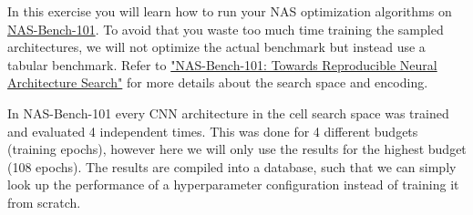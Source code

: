 \documentclass{exam}
\begin{document}
        \gccs
	In this exercise you will learn how to run your NAS optimization algorithms on \href{https://github.com/google-research/nasbench}{NAS-Bench-101}. To avoid that you waste too much time training the sampled architectures, we will not optimize the actual benchmark but instead use a tabular benchmark. Refer to \href{https://arxiv.org/abs/1902.09635}{"NAS-Bench-101: Towards Reproducible Neural Architecture Search"} for more details about the search space and encoding. 
	
	In NAS-Bench-101 every CNN architecture in the cell search space was trained and evaluated 4 independent times. This was done for 4 different budgets (training epochs), however here we will only use the results for the highest budget (108 epochs).
The results are compiled into a database, such that we can simply look up the performance of a hyperparameter configuration instead of training it from scratch.
\end{document}

